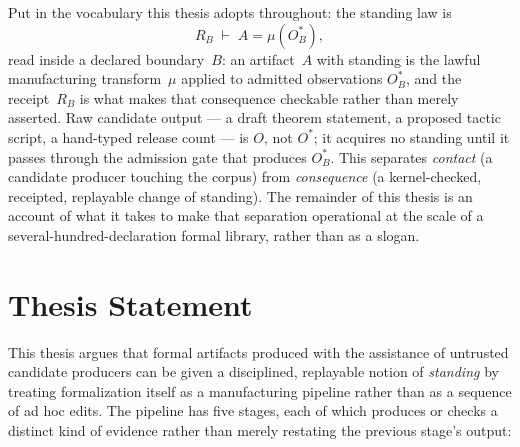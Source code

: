 Put in the vocabulary this thesis adopts throughout: the standing law is
\[
R_B \;\vdash\; A = \mu(O^*_B),
\]
read inside a declared boundary~$B$: an artifact~$A$ with standing is the
lawful manufacturing transform~$\mu$ applied to admitted observations
$O^*_B$, and the receipt~$R_B$ is what makes that consequence checkable
rather than merely asserted. Raw candidate output --- a draft theorem
statement, a proposed tactic script, a hand-typed release count --- is
$O$, not $O^*$; it acquires no standing until it passes through the
admission gate that produces $O^*_B$. This separates \emph{contact}
(a candidate producer touching the corpus) from \emph{consequence} (a
kernel-checked, receipted, replayable change of standing). The remainder
of this thesis is an account of what it takes to make that separation
operational at the scale of a several-hundred-declaration formal
library, rather than as a slogan.

\section{Thesis Statement}

This thesis argues that formal artifacts produced with the assistance of
untrusted candidate producers can be given a disciplined, replayable
notion of \emph{standing} by treating formalization itself as a
manufacturing pipeline rather than as a sequence of ad hoc edits. The
pipeline has five stages, each of which produces or checks a distinct
kind of evidence rather than merely restating the previous stage's
output:

